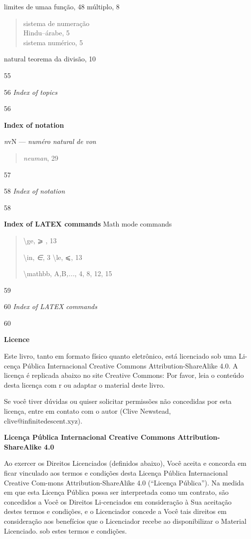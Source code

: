 \documentclass[
]{article}
\begin{document}
limites de umaa função, 48 múltiplo, 8

\begin{quote}
sistema de numeração\\
Hindu--árabe, 5\\
sistema numérico, 5
\end{quote}

natural teorema da divisão, 10

55

56 \emph{Index of topics}

56

\textbf{Index of notation}

\emph{n}vN --- \emph{numéro natural de von}

\begin{quote}
\emph{neuman}, 29
\end{quote}

57

58 \emph{Index of notation}

58

\textbf{Index of LATEX commands} Math mode commands

\begin{quote}
\textbackslash ge, ⩾ , 13

\textbackslash in, \emph{∈}, 3 \textbackslash le, ⩽, 13

\textbackslash mathbb, A\emph{,}B\emph{,...}, 4, 8, 12, 15
\end{quote}

59

60 \emph{Index of LATEX commands}

60

\textbf{Licence}

Este livro, tanto em formato físico quanto eletrônico, está licenciado
sob uma Li-cença Pública Internacional Creative Commons
Attribution-ShareAlike 4.0. A licença é replicada abaixo no site
Creative Commons: Por favor, leia o conteúdo desta licença com r ou
adaptar o material deste livro.

Se você tiver dúvidas ou quiser solicitar permissões não concedidas por
esta licença, entre em contato com o autor (Clive Newstead,
clive@infinitedescent.xyz).

\textbf{Licença Pública Internacional Creative Commons
Attribution-ShareAlike 4.0}

Ao exercer os Direitos Licenciados (definidos abaixo), Você aceita e
concorda em ficar vinculado aos termos e condições desta Licença Pública
Internacional Creative Com-mons Attribution-ShareAlike 4.0 (``Licença
Pública''). Na medida em que esta Licença Pública possa ser interpretada
como um contrato, são concedidos a Você os Direitos Li-cenciados em
consideração à Sua aceitação destes termos e condições, e o Licenciador
concede a Você tais direitos em consideração aos benefícios que o
Licenciador recebe ao disponibilizar o Material Licenciado. sob estes
termos e condições.
\end{document}
